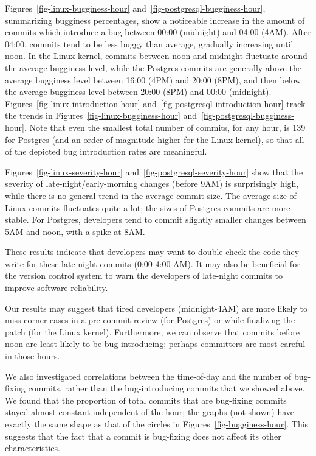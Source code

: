 Figures~\ref{fig-linux-bugginess-hour}
and~\ref{fig-postgresql-bugginess-hour}, summarizing bugginess
percentages, show a noticeable increase in the amount of commits which
introduce a bug between 00:00 (midnight) and 04:00 (4AM). After 04:00,
commits tend to be less buggy than average, gradually increasing until
noon.  In the Linux kernel, commits between noon and midnight
fluctuate around the average bugginess level, while the Postgres
commits are generally above the average bugginess level between 16:00
(4PM) and 20:00 (8PM), and then below the average bugginess level
between 20:00 (8PM) and 00:00
(midnight). Figures~\ref{fig-linux-introduction-hour}
and~\ref{fig-postgresql-introduction-hour} track the trends in
Figures~\ref{fig-linux-bugginess-hour}
and~\ref{fig-postgresql-bugginess-hour}. Note that even the smallest
total number of commits, for any hour, is 139 for Postgres (and an
order of magnitude higher for the Linux kernel), so that all of the
depicted bug introduction rates are meaningful.

Figures~\ref{fig-linux-severity-hour}
and~\ref{fig-postgresql-severity-hour} show that the severity of
late-night/early-morning changes (before 9AM) is surprisingly high,
while there is no general trend in the average commit size.
The average size of Linux commits fluctuates quite a lot; the sizes of
Postgres commits are more stable.  For Postgres, developers tend to
commit slightly smaller changes between 5AM and noon, with a spike at 8AM.

These results indicate that developers may want to double check the code they write for these 
late-night commits (0:00-4:00 AM).
It may also be beneficial for the version control
system to warn the developers of late-night commits to improve software reliability. 

Our results may suggest that tired developers (midnight-4AM) are more
likely to miss corner cases in a pre-commit review (for Postgres) or
while finalizing the patch (for the Linux kernel). Furthermore, we can observe
that commits before noon are least likely to be bug-introducing;
perhaps committers are most careful in those hours.
%

We also investigated correlations between the time-of-day and the
number of bug-fixing commits, rather than the bug-introducing commits
that we showed above. We found that the proportion of total
commits that are bug-fixing commits stayed almost constant independent
of the hour; the graphs (not shown) have exactly the same shape as
that of the circles in Figures~\ref{fig-bugginess-hour}.
This suggests that the fact
that a commit is bug-fixing does not affect its other characteristics.

